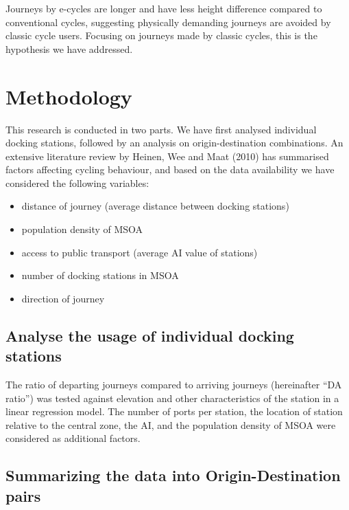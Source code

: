 \documentclass[
  12pt,
  a4paper,
  DIV=11,
  numbers=noendperiod]{scrartcl}
\providecommand{\tightlist}{%
  \setlength{\itemsep}{0pt}\setlength{\parskip}{0pt}}\usepackage{longtable,booktabs,array}
\begin{document}
Journeys by e-cycles are longer and have less height difference compared
to conventional cycles, suggesting physically demanding journeys are
avoided by classic cycle users. Focusing on journeys made by classic
cycles, this is the hypothesis we have addressed.

\hypertarget{methodology}{%
\section{Methodology}\label{methodology}}

This research is conducted in two parts. We have first analysed
individual docking stations, followed by an analysis on
origin-destination combinations. An extensive literature review by
Heinen, Wee and Maat (2010) has summarised factors affecting cycling
behaviour, and based on the data availability we have considered the
following variables:

\begin{itemize}
\tightlist
\item
  distance of journey (average distance between docking stations)
\item
  population density of MSOA
\item
  access to public transport (average AI value of stations)
\item
  number of docking stations in MSOA
\item
  direction of journey
\end{itemize}

\hypertarget{analyse-the-usage-of-individual-docking-stations}{%
\subsection{Analyse the usage of individual docking
stations}\label{analyse-the-usage-of-individual-docking-stations}}

The ratio of departing journeys compared to arriving journeys
(hereinafter ``DA ratio'') was tested against elevation and other
characteristics of the station in a linear regression model. The number
of ports per station, the location of station relative to the central
zone, the AI, and the population density of MSOA were considered as
additional factors.

\hypertarget{summarizing-the-data-into-origin-destination-pairs}{%
\subsection{Summarizing the data into Origin-Destination
pairs}\label{summarizing-the-data-into-origin-destination-pairs}}
\end{document}

